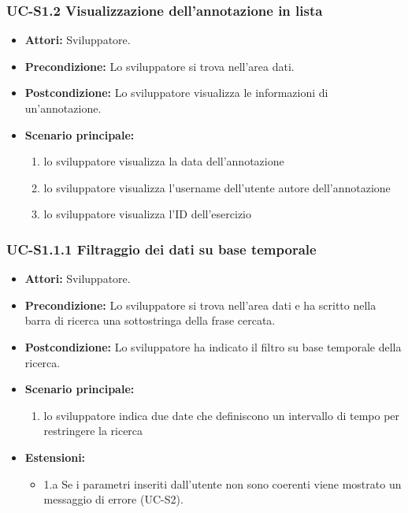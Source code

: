 	\subsubsection{UC-S1.2 Visualizzazione dell'annotazione in lista}
		\begin{itemize}
			\item \textbf{Attori:} Sviluppatore.
			\item \textbf{Precondizione:} Lo sviluppatore si trova nell'area dati.
			\item \textbf{Postcondizione:} Lo sviluppatore visualizza le informazioni di un'annotazione.
			\item \textbf{Scenario principale:}
				\begin{enumerate}
					\item lo sviluppatore visualizza la data dell'annotazione
					\item lo sviluppatore visualizza l'username dell'utente autore dell'annotazione
					\item lo sviluppatore visualizza l'ID dell'esercizio
				\end{enumerate}
		\end{itemize}
		
	\subsubsection{UC-S1.1.1 Filtraggio dei dati su base temporale}	
		\begin{itemize}
			\item \textbf{Attori:} Sviluppatore.
			\item \textbf{Precondizione:} Lo sviluppatore si trova nell'area dati e ha scritto nella barra di ricerca una sottostringa della frase cercata.
			\item \textbf{Postcondizione:} Lo sviluppatore ha indicato il filtro su base temporale della ricerca.
			\item \textbf{Scenario principale:}
				\begin{enumerate}
					\item lo sviluppatore indica due date che definiscono un intervallo di tempo per restringere la ricerca
				\end{enumerate}
			\item \textbf{Estensioni:}
				\begin{itemize}
					\item 1.a Se i parametri inseriti dall'utente non sono coerenti viene mostrato un messaggio di errore (UC-S2).
				\end{itemize}		
		\end{itemize}

